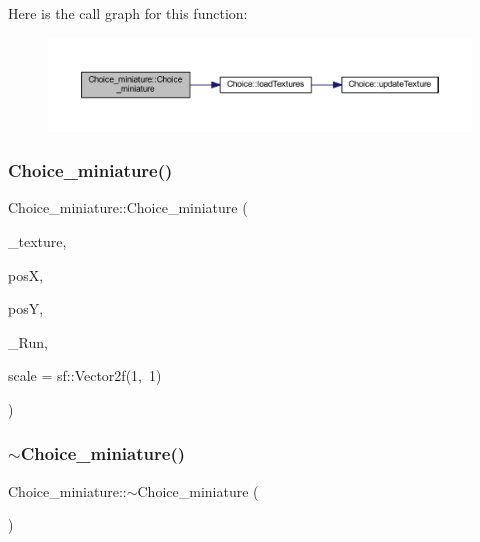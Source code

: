 Here is the call graph for this function\+:\nopagebreak
\begin{figure}[H]
\begin{center}
\leavevmode
\includegraphics[width=350pt]{class_choice__miniature_a9466ce86f30c59539f7fc0ef3acc23a7_cgraph}
\end{center}
\end{figure}
\mbox{\label{class_choice__miniature_ab84a88a43356f11596390de6700f7d38}} 
\subsubsection{\texorpdfstring{Choice\+\_\+miniature()}{Choice\_miniature()}\hspace{0.1cm}{\footnotesize\ttfamily [2/2]}}
{\footnotesize\ttfamily Choice\+\_\+miniature\+::\+Choice\+\_\+miniature (\begin{DoxyParamCaption}\item[{const char $\ast$}]{\+\_\+texture,  }\item[{float}]{posX,  }\item[{float}]{posY,  }\item[{std\+::function$<$ \hyperlink{_globals_8h_a3d5776bab98402b03be09156bacf4f68}{Screens}(const sf\+::\+Render\+Target \&, \hyperlink{class_game__window}{Game\+\_\+window} \&)$>$}]{\+\_\+\+Run,  }\item[{sf\+::\+Vector2f}]{scale = {\ttfamily sf\+:\+:Vector2f(1,~1)} }\end{DoxyParamCaption})}

\mbox{\label{class_choice__miniature_aa04b8d4c3ad3e99efad7ffe433d96fbe}} 
\subsubsection{\texorpdfstring{$\sim$\+Choice\+\_\+miniature()}{~Choice\_miniature()}}
{\footnotesize\ttfamily Choice\+\_\+miniature\+::$\sim$\+Choice\+\_\+miniature (\begin{DoxyParamCaption}{ }\end{DoxyParamCaption})\hspace{0.3cm}{\ttfamily [virtual]}}



